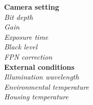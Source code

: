 \begin{minipage}[t]{0.975\linewidth}
\begin{multicols}{2}
\textbf{Camera setting} \hfill
\\[1mm]
\textsl{Bit depth} \hfill %
\\[1mm]
\textsl{Gain} \hfill %
\\[1mm]
\textsl{Exposure time} \hfill %
\\[1mm]
\textsl{Black level} \hfill %
\\[1mm]
\textsl{FPN correction} \hfill %
\\[1mm]
%
\textbf{External conditions} 
\\[1mm]
\textsl{Illumination wavelength} \hfill %
\\[1mm]
\textsl{Environmental temperature} \hfill %
\\[1mm]
\textsl{Housing temperature} \hfill %
\\[1mm]
\end{multicols}
\end{minipage}
